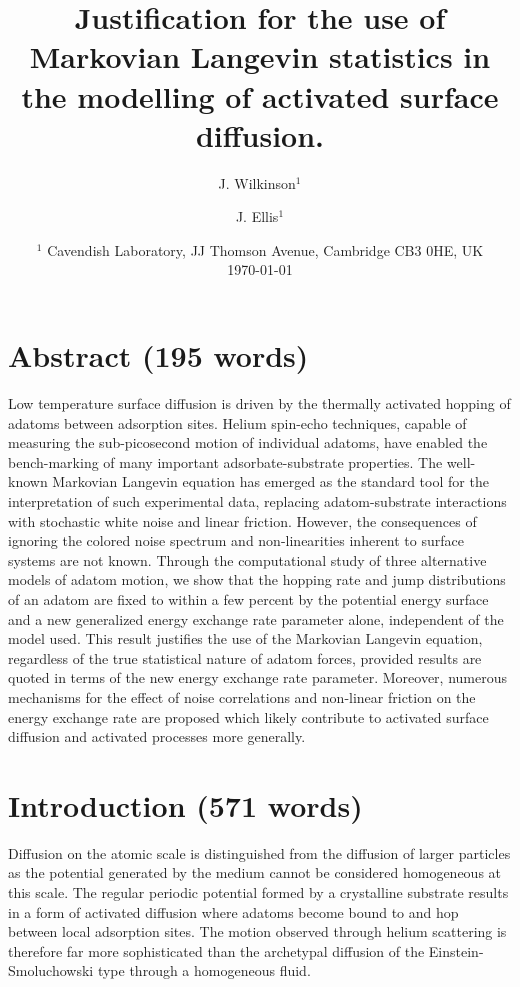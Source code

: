 \documentclass[7pt]{article}
\title{Justification for the use of Markovian Langevin statistics in the modelling of activated surface diffusion.}
\author{J. Wilkinson$^1$ \and J. Ellis$^1$}
\date{%
	$^1$ Cavendish Laboratory, JJ Thomson Avenue, Cambridge CB3 0HE, UK \\[2ex]%
    \today
}
\begin{document}
\maketitle

\section*{Abstract (195 words)}

Low temperature surface diffusion is driven by the thermally activated hopping of adatoms between adsorption sites. Helium spin-echo techniques, capable of measuring the sub-picosecond motion of individual adatoms, have enabled the bench-marking of many important adsorbate-substrate properties. The well-known Markovian Langevin equation has emerged as the standard tool for the interpretation of such experimental data, replacing adatom-substrate interactions with stochastic white noise and linear friction. However, the consequences of ignoring the colored noise spectrum and non-linearities inherent to surface systems are not known. Through the computational study of three alternative models of adatom motion, we show that the hopping rate and jump distributions of an adatom are fixed to within a few percent by the potential energy surface and a new generalized energy exchange rate parameter alone, independent of the model used. This result justifies the use of the Markovian Langevin equation, regardless of the true statistical nature of adatom forces, provided results are quoted in terms of the new energy exchange rate parameter. Moreover, numerous mechanisms for the effect of noise correlations and non-linear friction on the energy exchange rate are proposed which likely contribute to activated surface diffusion and activated processes more generally. 

\section*{Introduction (571 words)}

Diffusion on the atomic scale is distinguished from the diffusion of larger particles as the potential generated by the medium cannot be considered homogeneous at this scale\cite{Jardine2004}. The regular periodic potential formed by a crystalline substrate results in a form of activated diffusion where adatoms become bound to and hop between local adsorption sites. The motion observed through helium scattering is therefore far more sophisticated than the archetypal diffusion of the Einstein-Smoluchowski type through a homogeneous fluid\cite{Jardine200906}.
\end{document}
